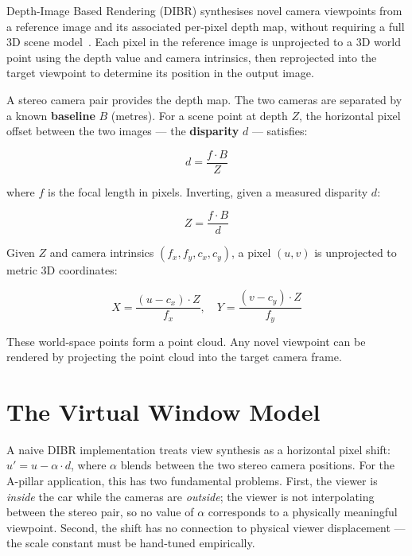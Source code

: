 \documentclass[11pt, a4paper]{report}
\begin{document}
Depth-Image Based Rendering (DIBR) synthesises novel camera viewpoints
from a reference image and its associated per-pixel depth map, without
requiring a full 3D scene model~\cite{fehn2004depth}.
Each pixel in the reference image is unprojected to a 3D world point
using the depth value and camera intrinsics, then reprojected into the
target viewpoint to determine its position in the output image.

A stereo camera pair provides the depth map.
The two cameras are separated by a known \textbf{baseline} $B$ (metres).
For a scene point at depth $Z$, the horizontal pixel offset between the
two images --- the \textbf{disparity} $d$ --- satisfies:

\begin{equation}
    d = \frac{f \cdot B}{Z}
    \label{eq:disparity}
\end{equation}

where $f$ is the focal length in pixels.
Inverting, given a measured disparity $d$:

\begin{equation}
    Z = \frac{f \cdot B}{d}
    \label{eq:depth_from_disparity}
\end{equation}

Given $Z$ and camera intrinsics $(f_x, f_y, c_x, c_y)$, a pixel $(u, v)$
is unprojected to metric 3D coordinates:

\begin{equation}
    X = \frac{(u - c_x) \cdot Z}{f_x}, \quad
    Y = \frac{(v - c_y) \cdot Z}{f_y}
    \label{eq:unproject}
\end{equation}

These world-space points form a point cloud.
Any novel viewpoint can be rendered by projecting the point cloud into
the target camera frame.

\section{The Virtual Window Model}
\label{sec:vwindow}

A naive DIBR implementation treats view synthesis as a horizontal pixel
shift: $u' = u - \alpha \cdot d$, where $\alpha$ blends between the two
stereo camera positions.
For the A-pillar application, this has two fundamental problems.
First, the viewer is \emph{inside} the car while the cameras are
\emph{outside}; the viewer is not interpolating between the stereo pair,
so no value of $\alpha$ corresponds to a physically meaningful viewpoint.
Second, the shift has no connection to physical viewer displacement ---
the scale constant must be hand-tuned empirically.
\end{document}
